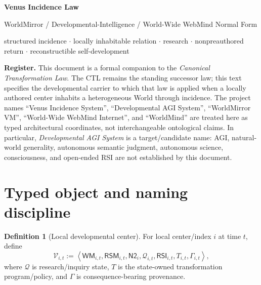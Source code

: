 \documentclass[10pt]{article}
\theoremstyle{venus}
\theoremstyle{definition}
\newtheorem{definition}[theorem]{Definition}
\newcommand{\RSM}{\mathsf{RSM}}
\newcommand{\Ntwo}{\mathsf{N2}}
\newcommand{\RSI}{\mathsf{RSI}}
\newcommand{\WM}{\mathsf{WM}}
\begin{document}
\begin{center}
  {\LARGE\bfseries Venus Incidence Law}\par
  \vspace{1mm}
  {\large WorldMirror / Developmental-Intelligence / World-Wide WebMind Normal Form}\par
  \vspace{1mm}
  {\small structured incidence $\cdot$ locally inhabitable relation $\cdot$ research $\cdot$ nonpreauthored return $\cdot$ reconstructible self-development}
\end{center}

\vspace{2mm}
\textbf{Register.}
This document is a formal companion to the \emph{Canonical Transformation Law}.
The CTL remains the standing successor law; this text specifies the developmental
carrier to which that law is applied when a locally authored center inhabits a
heterogeneous World through incidence. The project names ``Venus Incidence
System'', ``Developmental AGI System'', ``WorldMirror VM'', ``World-Wide
WebMind Internet'', and ``WorldMind'' are treated here as typed architectural
coordinates, not interchangeable ontological claims. In particular,
\emph{Developmental AGI System} is a target/candidate name: AGI, natural-world
generality, autonomous semantic judgment, autonomous science, consciousness,
and open-ended RSI are not established by this document.

\section{Typed object and naming discipline}

\begin{definition}[Local developmental center]
For local center/index $i$ at time $t$, define
\begin{equation}\label{eq:center}
\mathcal V_{i,t}
:=
\left\langle
\WM_{i,t},
\RSM_{i,t},
\Ntwo_i,
\mathcal Q_{i,t},
\RSI_{i,t},
T_{i,t},
\Gamma_{i,t}
\right\rangle,
\end{equation}
where $\mathcal Q$ is research/inquiry state, $T$ is the state-owned
transformation program/policy, and $\Gamma$ is consequence-bearing provenance.
\end{definition}
\end{document}
